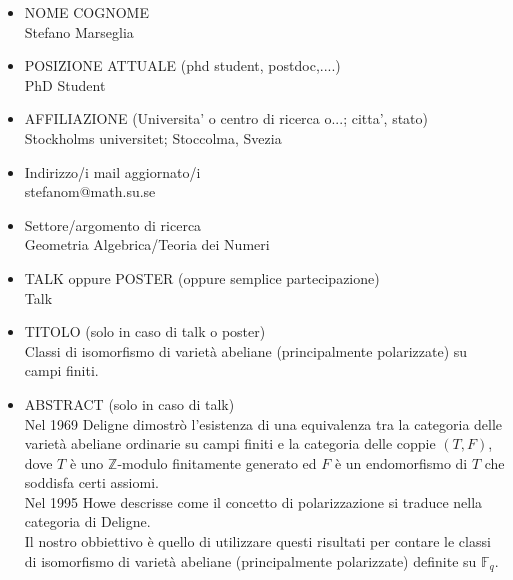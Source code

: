 \documentclass[11pt]{amsart}
\begin{document}
\begin{itemize}

\item NOME COGNOME\\
Stefano Marseglia

\item POSIZIONE ATTUALE (phd student, postdoc,....)\\
PhD Student

\item AFFILIAZIONE (Universita' o centro di ricerca o...; citta', stato) \\
Stockholms universitet; Stoccolma, Svezia

\item Indirizzo/i  mail aggiornato/i\\
stefanom@math.su.se

\item Settore/argomento di ricerca\\
Geometria Algebrica/Teoria dei Numeri

\item  TALK  oppure POSTER (oppure semplice partecipazione)\\
Talk

\item TITOLO (solo in caso di talk o poster)\\
Classi di isomorfismo di variet\`a abeliane (principalmente polarizzate) su campi finiti.

\item ABSTRACT  (solo in caso di talk)\\
Nel 1969 Deligne dimostr\`o l'esistenza di una equivalenza tra la categoria delle variet\`a abeliane ordinarie su campi finiti e la categoria delle coppie $(T,F)$, dove $T$ \`e uno $\mathbb Z$-modulo finitamente generato ed $F$ \`e un endomorfismo di $T$ che soddisfa certi assiomi.\\
Nel 1995 Howe descrisse come il concetto di polarizzazione si traduce nella categoria di Deligne.\\
Il nostro obbiettivo \`e quello di utilizzare questi risultati per contare le classi di isomorfismo di variet\`a abeliane (principalmente polarizzate) definite su $\mathbb F_q$.
\end{itemize}
\end{document}
